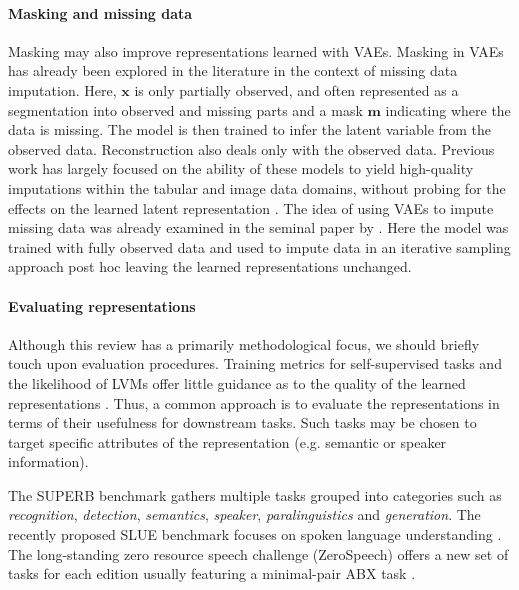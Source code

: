 {\paragraph{Masking and missing data}
Masking may also improve representations learned with VAEs. 
Masking in VAEs has already been explored in the literature in the context of missing data imputation. Here, $\mathbf{x}$ is only partially observed, and often represented as a segmentation into observed and missing parts and a mask $\mathbf{m}$ indicating where the data is missing. The model is then trained to infer the latent variable from the observed data. Reconstruction also deals only with the observed data. Previous work has largely focused on the ability of these models to yield high-quality imputations within the tabular and image data domains, without probing for the effects on the learned latent representation \cite{mattei_miwae_2019, ipsen_not-miwae_2021}. 
The idea of using VAEs to impute missing data was already examined in the seminal paper by \citet{rezende_stochastic_2014}. Here the model was trained with fully observed data and used to impute data in an iterative sampling approach post hoc leaving the learned representations unchanged.

\paragraph{Evaluating representations} 
Although this review has a primarily methodological focus, we should briefly touch upon evaluation procedures.
Training metrics for self-supervised tasks and the likelihood of LVMs offer little guidance as to the quality of the learned representations \cite{huszar_is_2017}. Thus, a common approach is to evaluate the representations in terms of their usefulness for downstream tasks. Such tasks may be chosen to target specific attributes of the representation (e.g. semantic or speaker information).

The SUPERB benchmark \cite{yang_superb_2021} gathers multiple tasks grouped into categories such as \emph{recognition}, \emph{detection}, \emph{semantics}, \emph{speaker}, \emph{paralinguistics} and \emph{generation}. 
The recently proposed SLUE benchmark focuses on spoken language understanding \cite{shon_slue_2021}.
The long-standing zero resource speech challenge (ZeroSpeech) offers a new set of tasks for each edition \cite{versteegh_zero_2015, dunbar_zero_2017, dunbar_zero_2019, dunbar_zero_2020, dunbar_zero_2021} usually featuring a minimal-pair ABX task \cite{schatz_evaluating_2013, schatz_evaluating_2014}. 
 
}
